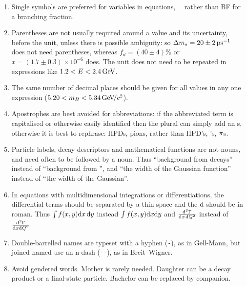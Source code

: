 \begin{enumerate}
\item Single symbols are preferred for variables in equations, \eg\
  \BF\ rather than BF for a branching fraction.

\item Parentheses are not usually required around a value and its
  uncertainty, before the unit, unless there is possible ambiguity: so
  \mbox{${\Delta m_{{s}}} = 20 \pm 2\text{\,ps}^{-1}$} does not need parentheses,
  whereas \mbox{$f_d = (40 \pm 4)$\%} or \mbox{$x=(1.7\pm0.3)\times 10^{-6}$} does.
  The unit does not need to be repeated in
  expressions like \mbox{$1.2 < E < 2.4\text{\,Ge\kern -0.1em V}$}.

\item The same number of decimal places should be given for all values
  in any one expression (\eg \mbox{$5.20 < m_B < 5.34\text{\,Ge\kern -0.1em V\!/}c^2$}).

\item Apostrophes are best avoided for abbreviations: if the abbreviated term
  is capitalised or otherwise easily identified then the plural can simply add
  an s, otherwise it is best to rephrase: \eg HPDs, pions, rather
  than HPD's, \piz's, ${\pi}$s.

\item Particle labels, decay descriptors and mathematical functions are not nouns, and need often to be followed by a noun. 
Thus ``background from \decay{\Bd}{\pip\pim} decays'' instead of ``background from \decay{\Bd}{\pip\pim}'',
and ``the width of the Gaussian function'' instead of ``the width of the Gaussian''.

\item In equations with multidimensional integrations or differentiations, the differential terms should be separated by a thin space and the $\rm d$ should be in roman.
Thus $\int f(x,y) {\rm d}x\,{\rm d}y$ instead $\int f(x,y) {\rm d}x{\rm d}y$ and
$\frac{{\rm d}^2\Gamma}{{\rm d}x\,{\rm d}Q^2}$ instead of $\frac{{\rm d}^2\Gamma}{{\rm d}x{\rm d}Q^2}$.

\item Double-barrelled names are typeset with a hyphen (\verb!-!), as in Gell-Mann, but joined named use an n-dash (\verb!--!), as in Breit--Wigner. 

\item Avoid gendered words. Mother is rarely needed. Daughter can be a decay product or a final-state particle. Bachelor can be replaced by companion.
\end{enumerate}


